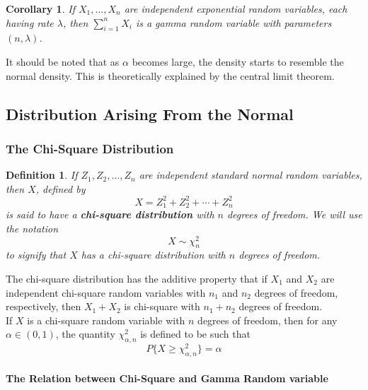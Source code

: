 \documentclass[12pt]{article}
\newtheorem{definition}[theorem]{Definition}
\newtheorem{corollary}[theorem]{Corollary}
\begin{document}
\begin{corollary}
  If $X_1,\dots,X_n$ are independent exponential random variables, each having rate $\lambda$, then $\sum_{i=1}^n X_i$ is a gamma random variable with parameters $(n, \lambda)$.
\end{corollary}

It should be noted that as $\alpha$ becomes large, the density starts to resemble the normal density. This is theoretically explained by the central limit theorem.

\subsection{Distribution Arising From the Normal}

\subsubsection{The Chi-Square Distribution}

\begin{definition}
  If $Z_1, Z_2, \dots, Z_n$ are independent standard normal random variables, then $X$, defined by
  \begin{equation*}
    X = Z_1^2 + Z_2^2 + \cdots + Z_n^2
  \end{equation*}
  is said to have a \textbf{chi-square distribution} with $n$ degrees of freedom. We will use the notation
  \begin{equation*}
    X \sim \chi_n^2
  \end{equation*}
  to signify that $X$ has a chi-square distribution with $n$ degrees of freedom.
\end{definition}

The chi-square distribution has the additive property that if $X_1$ and $X_2$ are independent chi-square random variables with $n_1$ and $n_2$ degrees of freedom, respectively, then $X_1 + X_2$ is chi-square with $n_1+n_2$ degrees of freedom. \\

If $X$ is a chi-square random variable with $n$ degrees of freedom, then for any $\alpha \in (0,1)$, the quantity $\chi_{\alpha,n}^2$ is defined to be such that
\begin{equation*}
  P \{ X \ge \chi_{\alpha,n}^2 \} = \alpha
\end{equation*}

\paragraph{The Relation between Chi-Square and Gamma Random variable}
\end{document}
